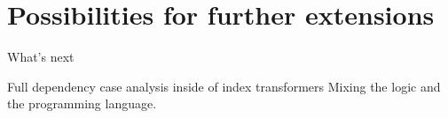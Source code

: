 \section{Possibilities for further extensions}\label{sec:ext}
What's next

Full dependency
case analysis inside of index transformers
Mixing the logic and the programming language.

